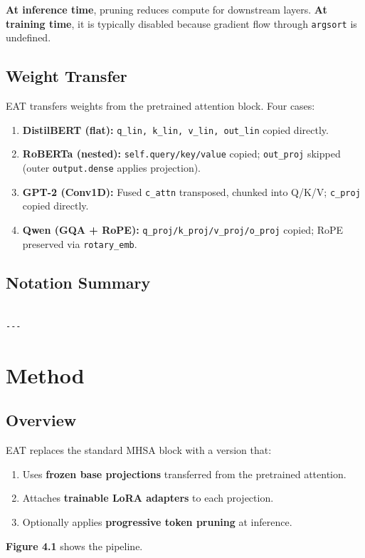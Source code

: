 \textbf{At inference time}, pruning reduces compute for downstream layers. 
\textbf{At training time}, it is typically disabled because gradient flow through 
\texttt{argsort} is undefined.

\subsection{Weight Transfer}

EAT transfers weights from the pretrained attention block. Four cases:

\begin{enumerate}
\item \textbf{DistilBERT (flat):} \texttt{q\_lin, k\_lin, v\_lin, out\_lin} copied directly.
\item \textbf{RoBERTa (nested):} \texttt{self.query/key/value} copied; \texttt{out\_proj} skipped
  (outer \texttt{output.dense} applies projection).
\item \textbf{GPT-2 (Conv1D):} Fused \texttt{c\_attn} transposed, chunked into Q/K/V;
  \texttt{c\_proj} copied directly.
\item \textbf{Qwen (GQA + RoPE):} \texttt{q\_proj/k\_proj/v\_proj/o\_proj} copied; RoPE
  preserved via \texttt{rotary\_emb}.

\end{enumerate}
\subsection{Notation Summary}

\begin{lstlisting}

---
\end{lstlisting}


\section{Method}

\subsection{Overview}

EAT replaces the standard MHSA block with a version that:

\begin{enumerate}
\item Uses \textbf{frozen base projections} transferred from the pretrained attention.
\item Attaches \textbf{trainable LoRA adapters} to each projection.
\item Optionally applies \textbf{progressive token pruning} at inference.

\end{enumerate}
\textbf{Figure 4.1} shows the pipeline.

